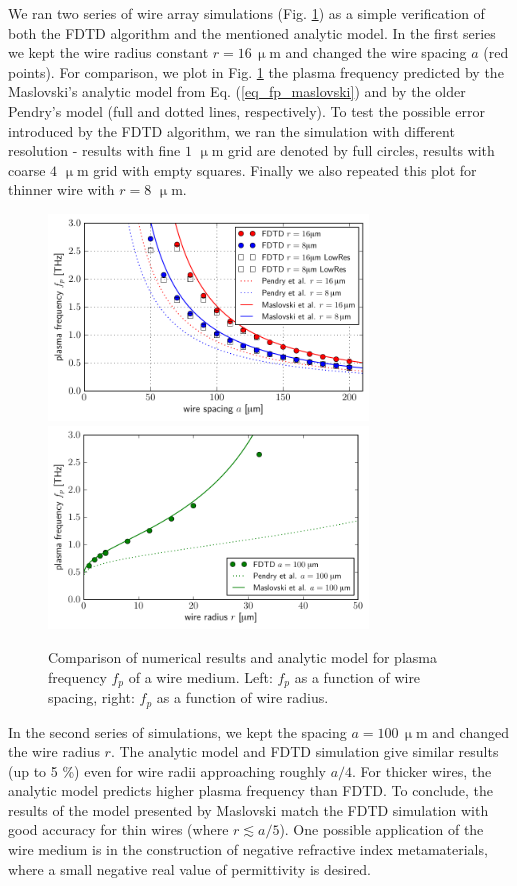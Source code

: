 {We ran two series of wire array simulations (Fig. \ref{fg_omegap_a}) as a simple verification of both the FDTD algorithm and the mentioned analytic model. In the first series we kept the wire radius constant $r = 16\,\upmu$m  and changed the wire spacing $a$ (red points). For comparison, we plot in Fig. \ref{fg_omegap_a} the plasma frequency predicted by the Maslovski's analytic model\cite{maslovski2002wire} from Eq. (\ref{eq_fp_maslovski}) and by the older Pendry's model \cite{pendry1996extremely} (full and dotted lines, respectively). To test the possible error introduced by the FDTD algorithm, we ran the simulation with different resolution - results with fine $1$ $\upmu$m grid are denoted by full circles, results with coarse $4$ $\upmu$m grid with empty squares. Finally we also repeated this plot for thinner wire with $r = 8$ $\upmu$m.
\begin{figure}[ht] \caption{Comparison of numerical results and analytic model for plasma frequency $f_p$ of a wire medium. Left: $f_p$ as a function of wire spacing, right: $f_p$ as a function of wire radius. } \label{fg_omegap_a} \centering 
\includegraphics[width=8.5cm]{img/EWire_plasmaF_spacingscan.pdf}
\includegraphics[width=8.5cm]{img/EWire_plasmaF_radiusscan.pdf}
\end{figure}

In the second series of simulations, we kept the spacing $a = 100\,\upmu$m and changed the wire radius $r$. The analytic model\cite{maslovski2002wire} and FDTD simulation give similar results (up to 5 \%) even for wire radii approaching roughly $a/4$. For thicker wires, the analytic model predicts higher plasma frequency than FDTD.  To conclude, the results of the model presented by Maslovski match the FDTD simulation with good accuracy for thin wires (where $r \lesssim a/5$). One possible application of the wire medium is in the construction of negative refractive index metamaterials, where a small negative real value of permittivity is desired.
}





